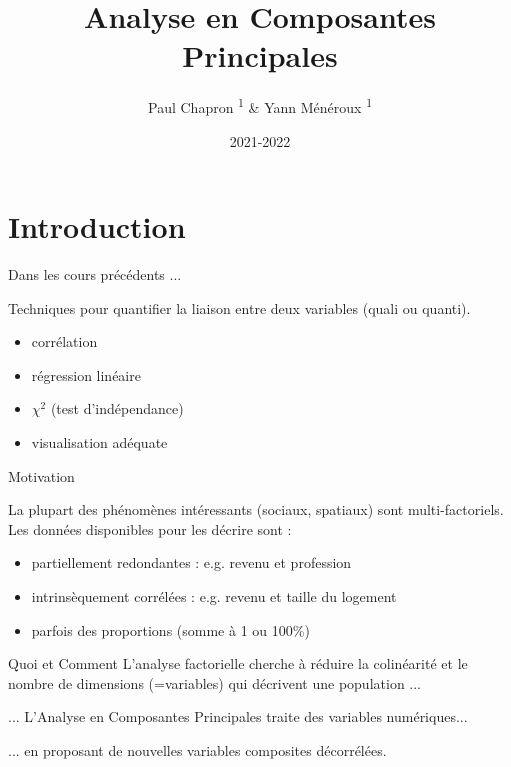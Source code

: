 \documentclass{beamer}
\title{Analyse en Composantes Principales}
\subtitle{}
\date{2021-2022}
\author{Paul Chapron \textsuperscript{1} \& Yann Ménéroux \textsuperscript{1}}
\institute{ \textsuperscript{1}IGN-ENSG-UGE}
\begin{document}
\maketitle	

\section{Introduction} 

\begin{frame}{Dans les cours précédents ... }


Techniques pour quantifier la liaison entre \alert{deux} variables (quali ou quanti). 

\begin{itemize}
\item corrélation
\item régression linéaire
\item $\chi^2$  (test d'indépendance)
\item visualisation adéquate 
\end{itemize}

\end{frame}


\begin{frame}{Motivation}


La plupart des phénomènes intéressants (sociaux, spatiaux) sont \alert{multi-factoriels}. Les données disponibles pour les décrire sont :

\begin{itemize}
	\item partiellement \alert{redondantes}  :   e.g. revenu et profession
	\item intrinsèquement \alert{corrélées} : e.g. revenu et taille du logement
	\item parfois des proportions (somme à 1 ou 100\%)
\end{itemize}
\end{frame}

\begin{frame}{Quoi et Comment}
L'analyse \alert{factorielle}  cherche à réduire la \alert{colinéarité} et le \alert{nombre de dimensions} (=variables) qui décrivent une population ... 

\medskip \medskip
... L'\alert{Analyse en Composantes Principales} traite des variables \alert{numériques}...

\medskip \medskip

... en proposant de nouvelles variables \alert{composites décorrélées}.
\end{frame}
\end{document}
